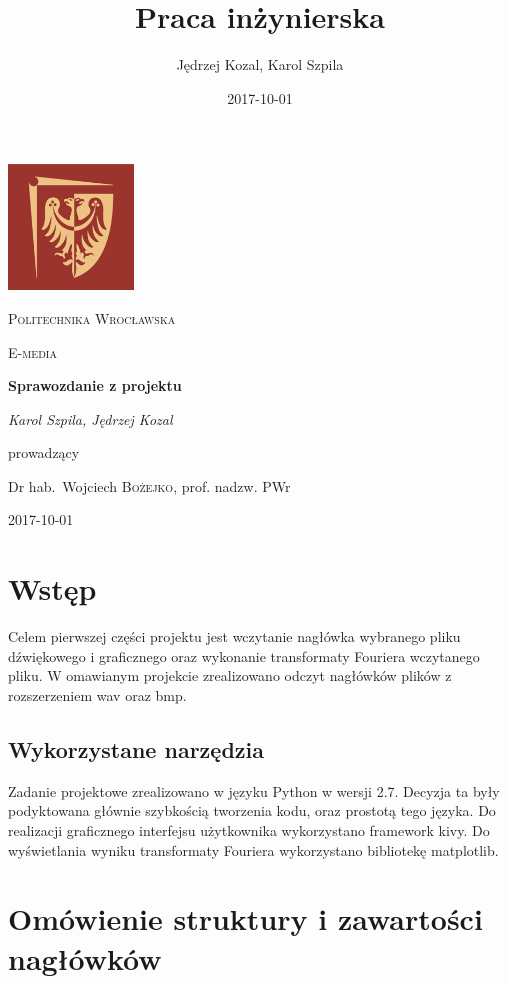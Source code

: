 \documentclass{article}
\title{Praca inżynierska}
\date{2017-10-01}
\author{Jędrzej Kozal, Karol Szpila}
\begin{document}
\begin{titlepage}
	\centering
	\includegraphics[width=0.25\textwidth]{logo_pol_wroclaw.png}\par\vspace{1cm}
	{\scshape\LARGE Politechnika Wrocławska \par}
	\vspace{1cm}
	{\scshape\Large E-media\par}
	\vspace{1.5cm}
	{\huge\bfseries Sprawozdanie z projektu \par}
	\vspace{2cm}
	{\Large\itshape Karol Szpila, Jędrzej Kozal\par}
	\vfill
	prowadzący\par
	Dr hab.~Wojciech \textsc{Bożejko}, prof. nadzw. PWr

	\vfill

	{\large 2017-10-01\par}
\end{titlepage}

	
\section{Wstęp}
Celem pierwszej części projektu jest wczytanie nagłówka wybranego pliku dźwiękowego i graficznego oraz wykonanie transformaty Fouriera wczytanego pliku. W omawianym projekcie zrealizowano odczyt nagłówków plików z rozszerzeniem wav oraz bmp.

\subsection{Wykorzystane narzędzia}
Zadanie projektowe zrealizowano w języku Python w wersji 2.7. Decyzja ta były podyktowana głównie szybkością tworzenia kodu, oraz prostotą tego języka. Do realizacji graficznego interfejsu użytkownika wykorzystano framework kivy. Do wyświetlania wyniku transformaty Fouriera wykorzystano bibliotekę matplotlib.

\section{Omówienie struktury i zawartości nagłówków}
\end{document}
